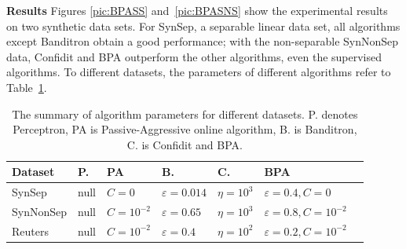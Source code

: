 \documentclass[twocolumn]{article}
\begin{document}

\textbf{Results}
Figures \ref{pic:BPASS} and~\ref{pic:BPASNS} show the experimental results on two synthetic data sets. For SynSep, a separable linear data set, all algorithms except Banditron obtain a good performance; with the non-separable SynNonSep data, Confidit and BPA outperform the other algorithms, even the supervised algorithms.  To different datasets, the parameters of different algorithms refer to Table~\ref{table:bpa}.
\begin{table}[h]
	\caption{The summary of algorithm parameters for different datasets. P. denotes Perceptron, PA is Passive-Aggressive online algorithm, B. is Banditron, C. is Confidit and BPA.}
	\label{table:bpa}
	\begin{center}
		\begin{tabular}{lllllll}
			{\bf Dataset}  & {\bf P.} & {\bf PA } & {\bf B.}& {\bf C.} & {\bf BPA}\\
			\hline
			SynSep & null & $C=0$ & $\varepsilon = 0.014$ &$\eta = 10^3$ & $\varepsilon = 0.4,C = 0$\\
			
			SynNonSep & null & $C=10^{-2}$ & $\varepsilon =0.65$ & $\eta = 10^3$& $\varepsilon = 0.8,C = 10^{-2}$\\
			
			Reuters & null & $C=10^{-2}$ & $\varepsilon =0.4$ & $\eta = 10^2$ & $\varepsilon = 0.2,C = 10^{-2}$\\
			
			
			
		\end{tabular}
	\end{center}
\end{table}
\end{document}
